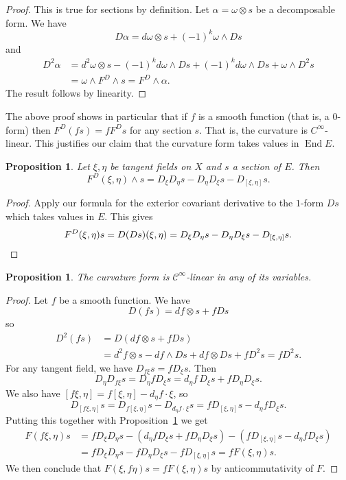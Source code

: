 \documentclass[11pt]{article}
\newtheorem{prop}[theo]{Proposition}
\theoremstyle{definition}
\newcommand{\cc}[1]{\mathcal{#1}}
\DeclareMathOperator{\End}{End}
\begin{document}
\begin{proof}
This is true for sections by definition. Let $\alpha = \omega \otimes s$ be a decomposable form. We have
$$
D\alpha = d\omega \otimes s + (-1)^k \omega \wedge Ds
$$
and
\begin{align*}
D^2 \alpha
&= d^2 \omega \otimes s - (-1)^k d\omega \wedge Ds
+ (-1)^k d\omega \wedge Ds + \omega \wedge D^2 s
\\
&= \omega \wedge F^D \wedge s
= F^D \wedge \alpha.
\end{align*}
The result follows by linearity.
\end{proof}

The above proof shows in particular that if $f$ is a smooth function (that is, a $0$-form) then $F^D(f s) = f F^D s$ for any section $s$. That is, the curvature is $C^\infty$-linear. This justifies our claim that the curvature form takes values in $\End E$.


\begin{prop}
\label{curvature-commutative}
Let $\xi, \eta$ be tangent fields on $X$ and $s$ a section of $E$. Then
$$
F^D(\xi, \eta) \wedge s
= D_\xi D_\eta s - D_\eta D_\xi s - D_{[\xi,\eta]} s.
$$
\end{prop}

\begin{proof}
Apply our formula for the exterior covariant derivative to the $1$-form $Ds$ which takes values in $E$. This gives
\[
F^D(\xi,\eta) s
= D(Ds)(\xi,\eta)
= D_\xi D_\eta s - D_\eta D_\xi s - D_{[\xi,\eta]} s.
\qedhere
\]
\end{proof}


\begin{prop}
The curvature form is $\cc C^\infty$-linear in any of its variables.
\end{prop}

\begin{proof}
Let $f$ be a smooth function. We have
$$
D(fs) = df \otimes s + f Ds
$$
so
\begin{align*}
D^2(fs)
&= D(df \otimes s + f Ds)
\\
&= d^2f \otimes s - df \wedge Ds + df \otimes Ds + f D^2 s
= f D^2 s.
\end{align*}
For any tangent field, we have $D_{f\xi}s = f D_\xi s$. Then
$$
D_\eta D_{f \xi} s
= D_\eta f D_\xi s
= d_\eta f \, D_\xi s + f D_\eta D_\xi s.
$$
We also have $[f\xi, \eta] = f[\xi,\eta] - d_\eta f \cdot \xi$, so
$$
D_{[f\xi,\eta]}s
= D_{f[\xi,\eta]}s - D_{d_\eta f \cdot \xi} s
= f D_{[\xi,\eta]} s - d_\eta f D_\xi s.
$$
Putting this together with Proposition~\ref{curvature-commutative} we get
\begin{align*}
F(f \xi, \eta) s
&= f D_\xi D_\eta s - (d_\eta f D_\xi s + f D_\eta D_\xi s) - (f D_{[\xi,\eta]} s - d_\eta f D_\xi s)
\\
&= f D_\xi D_\eta s - f D_\eta D_\xi s - f D_{[\xi,\eta]} s
= f F(\xi, \eta) s.
\end{align*}
We then conclude that $F(\xi,f \eta)s = f F(\xi,\eta) s$ by anticommutativity of $F$.
\end{proof}
\end{document}
